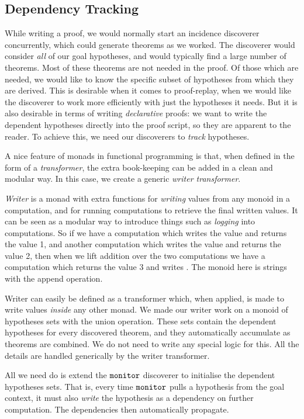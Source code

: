\subsection{Dependency Tracking}\label{sec:WriterMonad}
While writing a proof, we would normally start an incidence discoverer concurrently, which could generate theorems as we worked. The discoverer would consider \emph{all} of our goal hypotheses, and would typically find a large number of theorems. Most of these theorems are not needed in the proof. Of those which are needed, we would like to know the specific subset of hypotheses from which they are derived. This is desirable when it comes to proof-replay, when we would like the discoverer to work more efficiently with just the hypotheses it needs. But it is also desirable in terms of writing \emph{declarative} proofs: we want to write the dependent hypotheses directly into the proof script, so they are apparent to the reader. To achieve this, we need our discoverers to  \emph{track} hypotheses.

A nice feature of monads in functional programming is that, when defined in the form of a \emph{transformer}, the extra book-keeping can be added in a clean and modular way. In this case, we create a generic \emph{writer transformer}.

\emph{Writer} is a monad with extra functions for \emph{writing} values from any monoid in a computation, and for running computations to retrieve the final written values. It can be seen as a modular way to introduce things such as \emph{logging} into computations. So if we have a computation which writes the value  and returns the value 1, and another computation which writes the value  and returns the value 2, then when we lift addition over the two computations we have a computation which returns the value 3 and writes . The monoid here is strings with the append operation.

Writer can easily be defined as a transformer which, when applied, is made to write values \emph{inside} any other monad. We made our writer work on a monoid of hypotheses sets with the union operation. These sets contain the dependent hypotheses for every discovered theorem, and they automatically accumulate as theorems are combined. We do not need to write any special logic for this. All the details are handled generically by the writer transformer.

All we need do is extend the $\texttt{monitor}$ discoverer to initialise the dependent hypotheses sets. That is, every time $\texttt{monitor}$ pulls a hypothesis from the goal context, it must also \emph{write} the hypothesis as a dependency on further computation. The dependencies then automatically propagate. 

